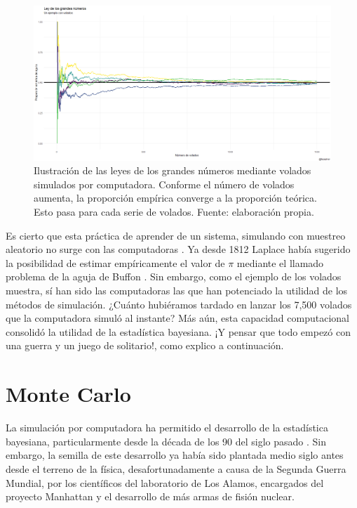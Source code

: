 \begin{figure}[h]
	\centering
	\includegraphics[scale=0.2]{Figs/LGN}
	\caption{Ilustración de las leyes de los grandes números mediante volados simulados por computadora. Conforme el número de volados aumenta, la proporción empírica converge a la proporción teórica. Esto pasa para cada serie de volados. Fuente: elaboración propia.}
	\label{fig:LGN}	
\end{figure}

Es cierto que esta práctica de aprender de un sistema, simulando con muestreo aleatorio no surge con las computadoras \parencite{Owen13}. Ya desde 1812 Laplace había sugerido la posibilidad de estimar empíricamente el valor de $\pi$ mediante el llamado problema de la aguja de Buffon \parencite{Ragheb13}. Sin embargo, como el ejemplo de los volados muestra, sí han sido las computadoras las que han potenciado la utilidad de los métodos de simulación. ¿Cuánto hubiéramos tardado en lanzar los 7,500 volados que la computadora simuló al instante? Más aún, esta capacidad computacional consolidó la utilidad de la estadística bayesiana. ¡Y pensar que todo empezó con una guerra y un juego de solitario!, como explico a continuación.

\section{Monte Carlo} 

La simulación por computadora ha permitido el desarrollo de la estadística bayesiana, particularmente desde la década de los 90 del siglo pasado \parencite{RobertCasella11}. Sin embargo, la semilla de este desarrollo ya había sido plantada medio siglo antes desde el terreno de la física, desafortunadamente a causa de la Segunda Guerra Mundial, por los científicos del laboratorio de Los Alamos, encargados del proyecto Manhattan y el desarrollo de más armas de fisión nuclear.\\

